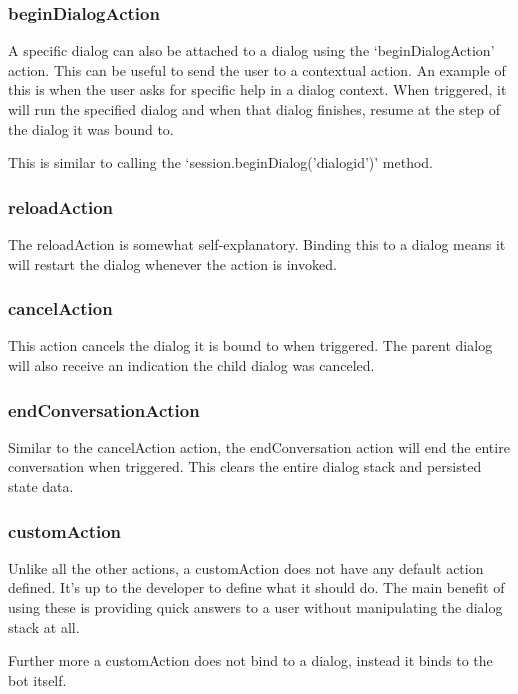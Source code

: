 \subsubsection{beginDialogAction}

A specific dialog can also be attached to a dialog using the `beginDialogAction' action. This can be useful to send the user to a contextual action. An example of this is when the user asks for specific help in a dialog context. When triggered, it will run the specified dialog and when that dialog finishes, resume at the step of the dialog it was bound to.

This is similar to calling the `session.beginDialog('dialogid')' method.

\subsubsection{reloadAction}

The reloadAction is somewhat self-explanatory. Binding this to a dialog means it will restart the dialog whenever the action is invoked.

\subsubsection{cancelAction}

This action cancels the dialog it is bound to when triggered. The parent dialog will also receive an indication the child dialog was canceled.

\subsubsection{endConversationAction}

Similar to the cancelAction action, the endConversation action will end the entire conversation when triggered. This clears the entire dialog stack and persisted state data.

\subsubsection{customAction}

Unlike all the other actions, a customAction does not have any default action defined. It's up to the developer to define what it should do. The main benefit of using these is providing quick answers to a user without manipulating the dialog stack at all.

Further more a customAction does not bind to a dialog, instead it binds to the bot itself.

